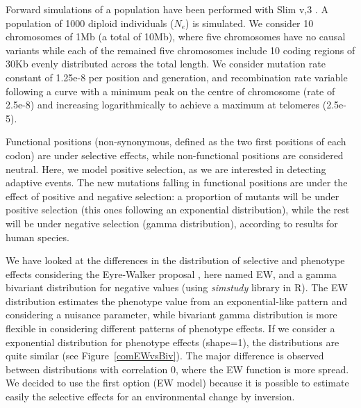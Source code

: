 \documentclass[a4paper,11pt]{article}
\begin{document}
Forward simulations of a population have been performed with Slim v,3 \citep{Haller:2019aa}. A population of 1000 diploid individuals ($N_e$) is simulated. We consider 10 chromosomes of 1Mb (a total of 10Mb), where five chromosomes have no causal variants while each of the remained five chromosomes include 10 coding regions of 30Kb evenly distributed across the total length. We consider mutation rate constant of 1.25e-8 per position and generation, and recombination rate variable following a curve with a minimum peak on the centre of chromosome (rate of 2.5e-8) and increasing logarithmically to achieve a maximum at telomeres (2.5e-5). %

Functional positions (non-synonymous, defined as the two first positions of each codon) are under selective effects, while non-functional positions are considered neutral. Here, we model positive selection, as we are interested in detecting adaptive events. The new mutations falling in functional positions are under the effect of positive and negative selection: a proportion of mutants will be under positive selection (this ones following an exponential distribution), while the rest will be under negative selection (gamma distribution), according to \citep{Boyko:2008aa} results for human species. 

We have looked at the differences in the distribution of selective and phenotype effects considering the Eyre-Walker proposal \citep{Eyre-Walker:2010aa}, here named EW, and a gamma bivariant distribution \citep{Caballero:2015aa} for negative values (using \textit{simstudy} library in R). The EW distribution estimates the phenotype value from an exponential-like pattern and considering a nuisance parameter, while bivariant gamma distribution   is more flexible in considering different patterns of phenotype effects. If we consider a exponential distribution for phenotype effects (shape=1), the distributions are quite similar (see Figure~\ref{comEWvsBiv}). The major difference is observed between distributions with correlation 0, where the EW function is more spread. We decided to use the first option (EW model) because it is possible to estimate easily the selective effects for an environmental change by inversion.
\end{document}
